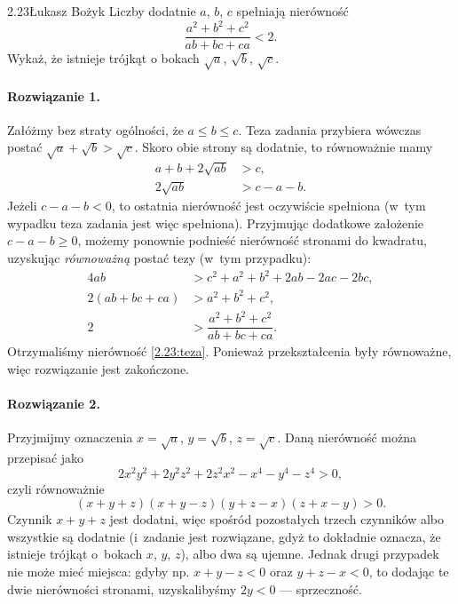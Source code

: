 
\begin{problem}{2.23}{Łukasz Bożyk}
Liczby dodatnie $a$, $b$, $c$ spełniają nierówność \begin{equation}\label{2.23:teza}
\frac{a^2+b^2+c^2}{ab+bc+ca}<2.\end{equation}
Wykaż, że istnieje trójkąt o bokach $\sqrt{a}$, $\sqrt{b}$, $\sqrt{c}$.
\end{problem}


\paragraph{Rozwiązanie 1.} Załóżmy bez straty ogólności, że $a\leq b\leq c$. Teza zadania przybiera wówczas postać $\sqrt{a}+\sqrt{b}>\sqrt{c}$. Skoro obie strony są dodatnie, to równoważnie mamy
\begin{align*}
    a+b+2\sqrt{ab}&>c,\\
    2\sqrt{ab}&>c-a-b.
\end{align*}
Jeżeli $c-a-b<0$, to ostatnia nierówność jest oczywiście spełniona (w~tym wypadku teza zadania jest więc spełniona). Przyjmując dodatkowe założenie $c-a-b\geq 0$, możemy ponownie podnieść nierówność stronami do kwadratu, uzyskując \emph{równoważną} postać tezy (w~tym przypadku):
\begin{align*}
    4ab&>c^2+a^2+b^2+2ab-2ac-2bc,\\
    2(ab+bc+ca)&>a^2+b^2+c^2,\\
    2&>\dfrac{a^2+b^2+c^2}{ab+bc+ca}.
\end{align*}
Otrzymaliśmy nierówność \eqref{2.23:teza}. Ponieważ przekształcenia były równoważne, więc rozwiązanie jest zakończone.

\paragraph{Rozwiązanie 2.}
    Przyjmijmy oznaczenia $x=\sqrt{a}$, $y=\sqrt{b}$, $z=\sqrt{c}$. Daną nierówność można przepisać jako
    \[2x^2y^2+2y^2z^2+2z^2x^2-x^4-y^4-z^4>0,\]
    czyli równoważnie
    \begin{equation}\label{2.23:iloczyn}(x+y+z)(x+y-z)(y+z-x)(z+x-y)> 0.\end{equation}
    Czynnik $x+y+z$ jest dodatni, więc spośród pozostałych trzech czynników albo wszystkie są dodatnie (i~zadanie jest rozwiązane, gdyż to dokładnie oznacza, że istnieje trójkąt o~bokach $x$, $y$, $z$), albo dwa są ujemne. Jednak drugi przypadek nie może mieć miejsca: gdyby np. $x+y-z<0$ oraz $y+z-x<0$, to dodając te dwie nierówności stronami, uzyskalibyśmy $2y<0$ --- sprzeczność.

